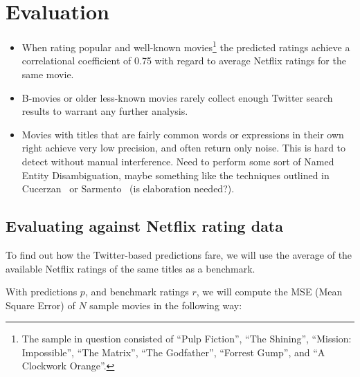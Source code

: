
\chapter{Evaluation} %

\label{Chapter5}




\begin{itemize}
  \item When rating popular and well-known movies\footnote{The sample in question consisted of ``Pulp Fiction'', ``The Shining'', ``Mission: Impossible'', ``The Matrix'', ``The Godfather'', ``Forrest Gump'', and ``A Clockwork Orange''.} the predicted ratings achieve a correlational coefficient of 0.75 with regard to average Netflix ratings for the same movie.
  \item B-movies or older less-known movies rarely collect enough Twitter search results to warrant any further analysis.
  \item Movies with titles that are fairly common words or expressions in their own right achieve very low precision, and often return only noise. This is hard to detect without manual interference. Need to perform some sort of Named Entity Disambiguation, maybe something like the techniques outlined in Cucerzan~\cite{NamedEntityDisambiguationWiki} or Sarmento~\cite{NamedEntityDisambiguationWS} (is elaboration needed?).
\end{itemize}

\section{Evaluating against Netflix rating data} %
\label{sec:evaluating_against_netflix_rating_data}

To find out how the Twitter-based predictions fare, we will use the average of the available Netflix ratings of the same titles as a benchmark.

With predictions $p$, and benchmark ratings $r$, we will compute the MSE (Mean Square Error) of $N$ sample movies in the following way:

